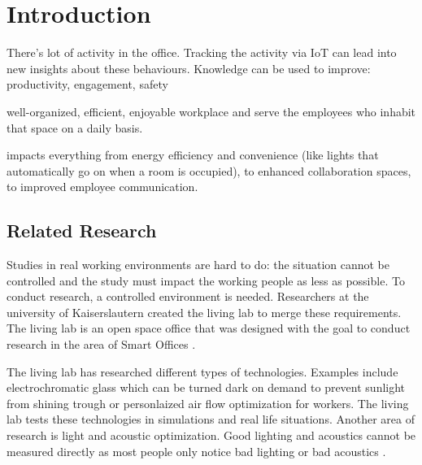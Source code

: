 \section{Introduction}
There's lot of activity in the office. Tracking the activity via IoT can lead into new insights about these behaviours. Knowledge can be used to improve: productivity, engagement, safety \cite{iotagenda}

well-organized, efficient, enjoyable workplace and serve the employees who inhabit that space on a daily basis.\cite{hbcommunications}

impacts everything from energy efficiency and convenience (like lights that automatically go on when a room is occupied), to enhanced
collaboration spaces, to improved employee communication. \cite{hbcommunications}

\subsection{Related Research}
Studies in real working environments are hard to do: the situation cannot be controlled and the study must impact the working people as less as possible. To conduct research, a controlled environment is needed. Researchers at the university of Kaiserslautern created the living lab to merge these requirements. The living lab is an open space office that was designed with the goal to conduct research in the area of Smart Offices \cite{living-lab}.


The living lab has researched different types of technologies. Examples include electrochromatic glass which can be turned dark on demand to prevent sunlight from shining trough or personlaized air flow optimization for workers. The living lab tests these technologies in simulations and real life situations. Another area of research is light and acoustic optimization. Good lighting and acoustics cannot be measured directly as most people only notice bad lighting or bad acoustics \cite{living-lab}.


